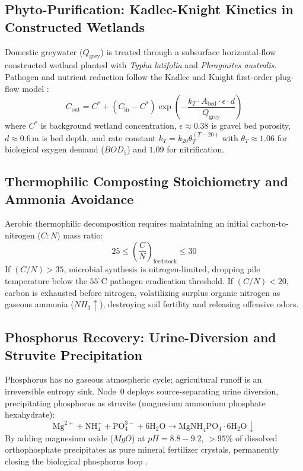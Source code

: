 \subsection{Phyto-Purification: Kadlec-Knight Kinetics in Constructed Wetlands}

Domestic greywater ($Q_{\mathrm{grey}}$) is treated through a subsurface horizontal-flow constructed wetland planted with \textit{Typha latifolia} and \textit{Phragmites australis}. Pathogen and nutrient reduction follow the Kadlec and Knight first-order plug-flow model \parencite{kadlec1996}:
\begin{equation}
C_{\mathrm{out}} = C^* + (C_{\mathrm{in}} - C^*) \exp\left( - \frac{k_T \cdot A_{\mathrm{bed}} \cdot \epsilon \cdot d}{Q_{\mathrm{grey}}} \right)
\label{eq:kadlec_knight}
\end{equation}
where $C^*$ is background wetland concentration, $\epsilon \approx 0.38$ is gravel bed porosity, $d \approx 0.6\,\mathrm{m}$ is bed depth, and rate constant $k_T = k_{20} \theta_T^{(T - 20)}$ with $\theta_T \approx 1.06$ for biological oxygen demand ($BOD_5$) and $1.09$ for nitrification.

\subsection{Thermophilic Composting Stoichiometry and Ammonia Avoidance}

Aerobic thermophilic decomposition requires maintaining an initial carbon-to-nitrogen ($C:N$) mass ratio:
\begin{equation}
25 \le \left(\frac{C}{N}\right)_{\mathrm{feedstock}} \le 30
\label{eq:cn_ratio}
\end{equation}
If $(C/N) > 35$, microbial synthesis is nitrogen-limited, dropping pile temperature below the $55^\circ\mathrm{C}$ pathogen eradication threshold. If $(C/N) < 20$, carbon is exhausted before nitrogen, volatilizing surplus organic nitrogen as gaseous ammonia ($NH_3 \uparrow$), destroying soil fertility and releasing offensive odors.

\subsection{Phosphorus Recovery: Urine-Diversion and Struvite Precipitation}

Phosphorus has no gaseous atmospheric cycle; agricultural runoff is an irreversible entropy sink. Node~0 deploys source-separating urine diversion, precipitating phosphorus as struvite (magnesium ammonium phosphate hexahydrate):
\begin{equation}
\mathrm{Mg}^{2+} + \mathrm{NH}_4^+ + \mathrm{PO}_4^{3-} + 6\mathrm{H}_2\mathrm{O} \longrightarrow \mathrm{MgNH}_4\mathrm{PO}_4 \cdot 6\mathrm{H}_2\mathrm{O} \downarrow
\label{eq:struvite}
\end{equation}
By adding magnesium oxide ($MgO$) at $pH = 8.8-9.2$, $>95\%$ of dissolved orthophosphate precipitates as pure mineral fertilizer crystals, permanently closing the biological phosphorus loop \parencite{odum1971}.

